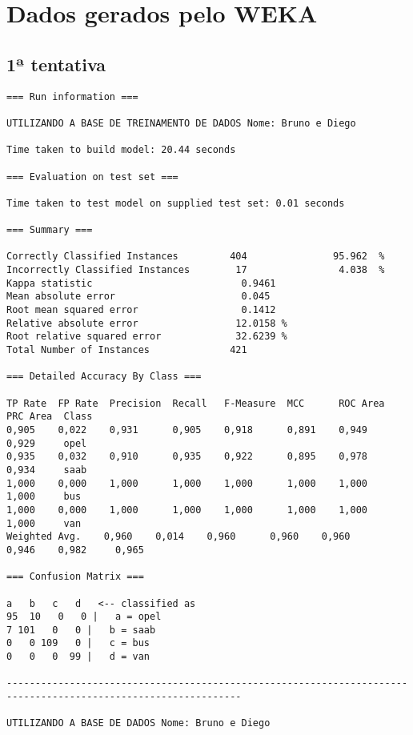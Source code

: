 \documentclass[
	article,			%
	11pt,				%
	oneside,			%
	a4paper,			%
	english,			%
	brazil,				%
	sumario=tradicional
	]{abntex2}
\begin{document}
\newpage 
\appendix
\chapter{Dados gerados pelo WEKA}


\section{1ª tentativa}

\begin{lstlisting}
=== Run information ===

UTILIZANDO A BASE DE TREINAMENTO DE DADOS Nome: Bruno e Diego

Time taken to build model: 20.44 seconds

=== Evaluation on test set ===

Time taken to test model on supplied test set: 0.01 seconds

=== Summary ===

Correctly Classified Instances         404               95.962  %
Incorrectly Classified Instances        17                4.038  %
Kappa statistic                          0.9461
Mean absolute error                      0.045 
Root mean squared error                  0.1412
Relative absolute error                 12.0158 %
Root relative squared error             32.6239 %
Total Number of Instances              421     

=== Detailed Accuracy By Class ===

TP Rate  FP Rate  Precision  Recall   F-Measure  MCC      ROC Area  PRC Area  Class
0,905    0,022    0,931      0,905    0,918      0,891    0,949     0,929     opel
0,935    0,032    0,910      0,935    0,922      0,895    0,978     0,934     saab
1,000    0,000    1,000      1,000    1,000      1,000    1,000     1,000     bus
1,000    0,000    1,000      1,000    1,000      1,000    1,000     1,000     van
Weighted Avg.    0,960    0,014    0,960      0,960    0,960      0,946    0,982     0,965     

=== Confusion Matrix ===

a   b   c   d   <-- classified as
95  10   0   0 |   a = opel
7 101   0   0 |   b = saab
0   0 109   0 |   c = bus
0   0   0  99 |   d = van

---------------------------------------------------------------------------------------------------------------

UTILIZANDO A BASE DE DADOS Nome: Bruno e Diego


\end{lstlisting}
\end{document}
